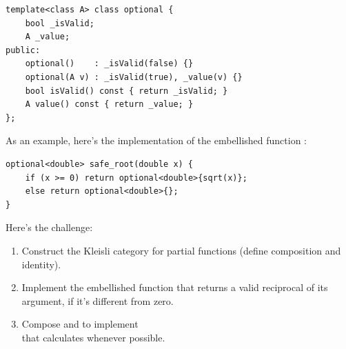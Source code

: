 \begin{Verbatim}
template<class A> class optional {
    bool _isValid;
    A _value;
public: 
    optional()    : _isValid(false) {}
    optional(A v) : _isValid(true), _value(v) {}
    bool isValid() const { return _isValid; }
    A value() const { return _value; }
};
\end{Verbatim}
As an example, here's the implementation of the embellished function
:

\begin{Verbatim}
optional<double> safe_root(double x) {
    if (x >= 0) return optional<double>{sqrt(x)}; 
    else return optional<double>{};
}
\end{Verbatim}
Here's the challenge:

\begin{enumerate}
\tightlist
\item
  Construct the Kleisli category for partial functions (define
  composition and identity).
\item
  Implement the embellished function  that
  returns a valid reciprocal of its argument, if it's different from
  zero.
\item
  Compose  and  to implement\\
   that calculates 
  whenever possible.
\end{enumerate}